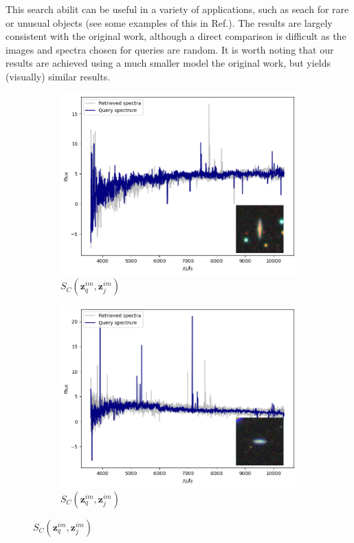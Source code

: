 \documentclass[a4paper,12pt]{article}
\begin{document}
This search abilit can be useful in a variety of applications, such as seach for rare or unusual objects (see some examples of this in Ref.\cite{stein}). The results are largely consistent with the original work, although a direct comparison is difficult as the images and spectra chosen for queries are random. It is worth noting that our results are achieved using a much smaller model the original work, but yields (visually) similar results.

\begin{figure}[H]
    \centering
    \begin{subfigure}[b]{0.45\textwidth}
        \centering
        \includegraphics[width=\textwidth]{../figures/spectral_retrieval_im_im_1}
        \caption{$S_C(\mathbf{z}_q^{im}, \mathbf{z}_j^{im})$}
        \label{fig:im_im_1}
    \end{subfigure}%
    \hfill
    \begin{subfigure}[b]{0.45\textwidth}
        \centering
        \includegraphics[width=\textwidth]{../figures/spectral_retrieval_im_im_2}
        \caption{$S_C(\mathbf{z}_q^{im}, \mathbf{z}_j^{im})$}
        \label{fig:im_im_2}
    \end{subfigure}


\end{figure}
\end{document}
